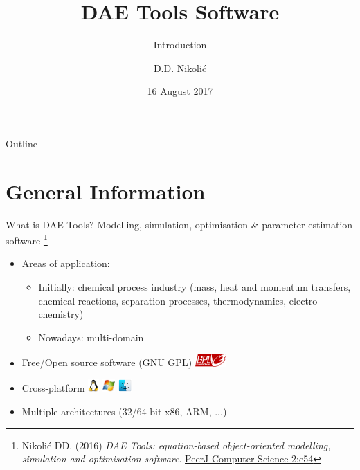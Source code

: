 \documentclass[compress,newPxFont,sthlmFooter]{beamer}
\title{DAE Tools Software}
\subtitle{Introduction}
\author{D.D. Nikolić}
\institute
{
  DAE Tools Project, \url{http://www.daetools.com}
}
\date{16 August 2017}
\begin{document}
\maketitle

\begin{frame}{Outline}
\tableofcontents[sectionstyle=show, 
                 subsectionstyle=hide]
\end{frame} 

\section{General Information}

\begin{frame}{What is DAE Tools?} 
\alert{Modelling}, \alert{simulation}, \alert{optimisation} \& \alert{parameter estimation} software
\footnote{\tiny{Nikolić DD. (2016) \textit{DAE Tools: equation-based object-oriented modelling, simulation and optimisation software}.
          \href{https://doi.org/10.7717/peerj-cs.54}{PeerJ Computer Science 2:e54}}
         }

\begin{itemize}
  \item Areas of application:
    \begin{itemize}
      \item Initially: \alert{chemical process industry} (mass, heat and momentum transfers, chemical reactions, 
                                                          separation processes, thermodynamics, electro-chemistry)
      \item Nowadays: \alert{multi-domain}
    \end{itemize}
  \item \alert{Free/Open source software} (GNU GPL) \includegraphics[align=c,height=1.3em]{gnu_gpl3.png}
  \item \alert{Cross-platform} \includegraphics[align=c,height=1.3em]{linux.png} 
                               \includegraphics[align=c,height=1.3em]{windows.png} 
                               \includegraphics[align=c,height=1.3em]{macos.png}
  \item \alert{Multiple architectures} (32/64 bit x86, ARM, ...)
\end{itemize}
\end{frame}
\end{document}
